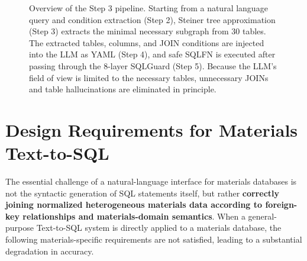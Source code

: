 \documentclass[5p,twocolumn]{elsarticle}
\begin{document}
\begin{figure}[htbp]
{%
}%
\caption{Overview of the Step 3 pipeline.
  Starting from a natural language query and condition extraction (Step 2),
  Steiner tree approximation (Step 3) extracts the minimal necessary subgraph from 30 tables.
  The extracted tables, columns, and JOIN conditions are injected into the LLM as YAML (Step 4),
  and safe SQLFN is executed after passing through the 8-layer SQLGuard (Step 5).
  Because the LLM's field of view is limited to the necessary tables,
  unnecessary JOINs and table hallucinations are eliminated in principle.}
\label{fig:step3_pipeline}
\end{figure}
\section{Design Requirements for Materials Text-to-SQL}
\label{sec:design_requirements}

The essential challenge of a natural-language interface for materials databases is
not the syntactic generation of SQL statements itself,
but rather
\textbf{correctly joining normalized heterogeneous materials data according to foreign-key relationships and materials-domain semantics}.
When a general-purpose Text-to-SQL system is directly applied to a materials database,
the following materials-specific requirements are not satisfied, leading to a substantial degradation in accuracy.
\end{document}
